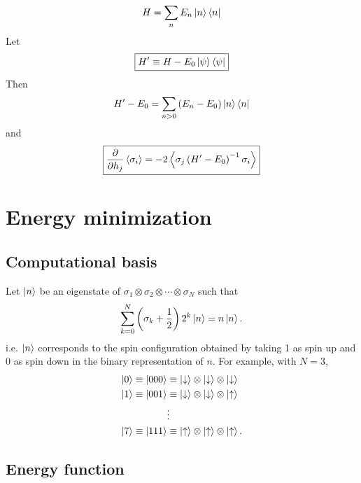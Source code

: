 \begin{equation}
  H = \sum_n E_n \left| n \right> \left< n \right|
  \label{}
\end{equation}
Let
\begin{equation}
  \boxed{
  H^{\prime} \equiv H - E_0 \left| \psi \right> \left< \psi \right|
  }
  \label{}
\end{equation}
Then
\begin{equation}
  H^{\prime} - E_0 = \sum_{n>0} \left( E_n - E_0 \right) \left| n \right> \left< n \right|
  \label{}
\end{equation}
and
\begin{equation}
  \boxed{
  \frac{\partial }{\partial h_j} \left< \sigma_i \right>
  = -2 \left< \sigma_j \left( H^{\prime} - E_0 \right)^{-1} \sigma_i \right>
  }
  \label{}
\end{equation}


\section{Energy minimization}

\subsection{Computational basis}

Let $\left| n \right>$ be an eigenstate of
$\sigma_1 \otimes \sigma_2 \otimes \cdots \otimes \sigma_N$
such that
\begin{equation}
    \sum_{k=0}^N \left( \sigma_k + \frac{1}{2} \right) 2^k \left| n \right> = n \left| n \right>.
  \label{}
\end{equation}
i.e. $\left| n \right>$ corresponds to the spin configuration obtained by taking 1
as spin up and 0 as spin down in the binary representation of $n$.
For example, with $N=3$,
\begin{align*}
  \left| 0 \right> \equiv \left| 000 \right>
  &\equiv
  \left| \downarrow \right> \otimes
  \left| \downarrow \right> \otimes
  \left| \downarrow \right> \\
  \left| 1 \right> \equiv \left| 001 \right>
  &\equiv
  \left| \downarrow \right> \otimes
  \left| \downarrow \right> \otimes
  \left| \uparrow \right> \\
  &\vdots \\
  \left| 7 \right> \equiv \left| 111 \right>
  &\equiv
  \left| \uparrow \right> \otimes
  \left| \uparrow \right> \otimes
  \left| \uparrow \right>.
  \label{}
\end{align*}
\subsection{Energy function}

